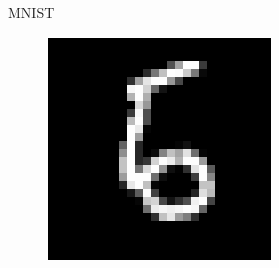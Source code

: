 \documentclass{beamer}
\begin{document}
\begin{frame}{MNIST}
\begin{minipage}[t]{0.32\columnwidth}
\begin{figure}
			\includegraphics[width=1\columnwidth]{pres_pics/high_conf/56}
		\end{figure}
	\end{minipage}
\end{frame}
\end{document}
